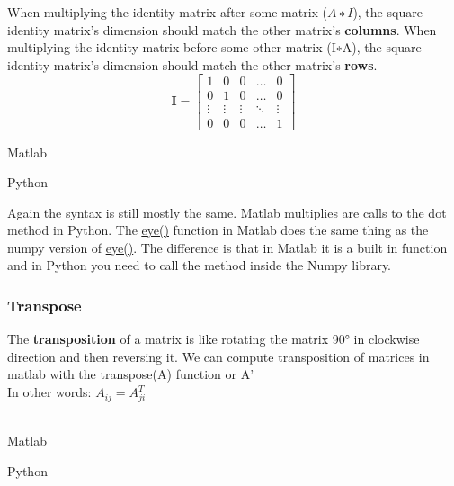 When multiplying the identity matrix after some matrix ($A∗I$), the square identity matrix's dimension should match the other matrix's \textbf{columns}. When multiplying the identity matrix before some other matrix (I∗A), the square identity matrix's dimension should match the other matrix's \textbf{rows}.\\

\begin{equation}
  \textbf{I} = \left[
    \begin{matrix}
      1 & 0 & 0 & \dots  & 0 \\
      0 & 1 & 0 & \dots  & 0 \\
      \vdots & \vdots & \vdots & \ddots & \vdots \\
      0 & 0 & 0 & \dots  & 1
    \end{matrix}
    \right]
  \label{eqn:IdentityMatrix}
\end{equation}

\newpage
\begin{multicols}{2}
  Matlab\\
  \columnbreak

  Python\\
  
\end{multicols}

Again the syntax is still mostly the same.  Matlab multiplies are calls to the dot method in Python.  The \underline{\href{https://www.mathworks.com/help/matlab/ref/eye.html}{eye()}} function in Matlab does the same thing as the numpy version of \underline{\href{https://docs.scipy.org/doc/numpy/reference/generated/numpy.eye.htm}{eye()}}.  The difference is that in Matlab it is a built in function and in Python you need to call the method inside the Numpy library.

\subsubsection{Transpose}

The \textbf{transposition} of a matrix is like rotating the matrix 90° in clockwise direction and then reversing it. We can compute transposition of matrices in matlab with the transpose(A) function or A'\\

In other words: $A_{ij} = A^T_{ji}$  \\

​\begin{multicols}{2}
  Matlab\\
  \columnbreak
  
  Python\\
  
\end{multicols}	


